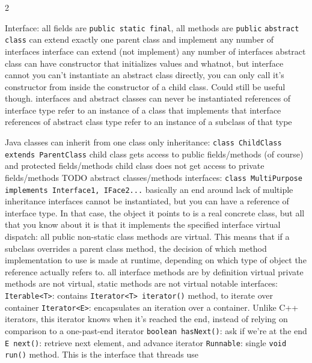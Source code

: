 \documentclass{article}
\def \columncount {2}
\newcommand{\codesize}{8.5}
\newcommand{\java}[1]{{\fontsize{\codesize}{\codesize}\selectfont\texttt{#1}}}
\begin{document}
\begin{multicols*}{\columncount}
\begin{outline}[longenum]
\zzz{\java{abstract class} vs \java{interface}}
  \1 Interface: all fields are \java{public static final}, all methods are \java{public}
  \1 \java{abstract class} can extend exactly one parent class and implement any number of interfaces
  \1 interface can extend (not implement) any number of interfaces
  \1 abstract class can have constructor that initializes values and whatnot, but interface cannot
    \2 you can't instantiate an abstract class directly, you can only call it's constructor from inside the constructor of a child class. Could still be useful though.
  \1 interfaces and abstract classes can never be instantiated
    \2 references of interface type refer to an instance of a class that implements that interface
    \2 references of abstract class type refer to an instance of a subclass of that type

  \1 Java classes can inherit from one class only
    \2 inheritance: \java{class ChildClass extends ParentClass}
    \2 child class gets access to public fields/methods (of course) and protected fields/methods
    \2 child class does not get access to private fields/methods
    \2 TODO abstract classes/methods
  \1 interfaces: \java{class MultiPurpose implements Interface1, IFace2...}
    \2 basically an end around lack of multiple inheritance
    \2 interfaces cannot be instantiated, but you can have a reference of interface type. In that case, the object it points to is a real concrete class, but all that you know about it is that it implements the specified interface
  \1 virtual dispatch:
    \2 all public non-static class methods are virtual.
      This means that if a subclass overrides a parent class method, the decision of which method implementation to use is made at runtime, depending on which type of object the reference actually refers to.
    \2 all interface methods are by definition virtual
    \2 private methods are not virtual, static methods are not virtual
  \1 notable interfaces:
    \2 \java{Iterable<T>}: contains \java{Iterator<T> iterator()} method, to iterate over container
    \2 \java{Iterator<E>}: encapsulates an iteration over a container. Unlike C++ iterators, this iterator knows when it's reached the end, instead of relying on comparison to a one-past-end iterator
      \3 \java{boolean hasNext()}: ask if we're at the end
      \3 \java{E next()}: retrieve next element, and advance iterator
    \2 \java{Runnable}: single \java{void run()} method. This is the interface that threads use


\end{outline}
\end{multicols*}
\end{document}
